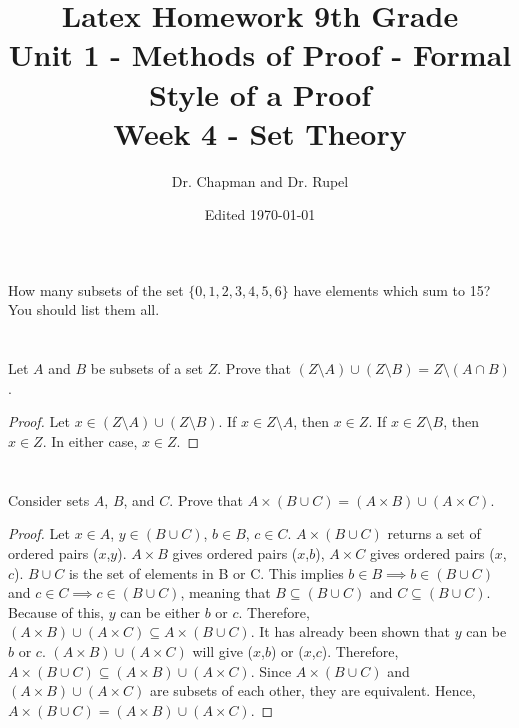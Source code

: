 \usepackage[utf8]{inputenc}
\usepackage{amsmath, amsfonts,fullpage,tikz}
\usepackage{amsthm}

\title{Latex Homework 9th Grade\\ Unit 1 - Methods of Proof - Formal Style of a Proof\\ Week 4 - Set Theory}
\author{Dr. Chapman and Dr. Rupel}
\date{Edited \today}
\newcommand{\sm}{\setminus}


\maketitle

\section{}
    How many subsets of the set \(\{0,1,2,3,4,5,6\}\) have elements which sum to 15?
    You should list them all.

\section{}
    Let $A$ and $B$ be subsets of a set $Z$.
    Prove that $(Z\sm A)\cup(Z\sm B)=Z\sm(A\cap B)$.
    \begin{proof}
     Let $x \in (Z\sm A)\cup(Z\sm B)$. If $x\in Z\sm A$, then $x\in Z$. If $x\in Z\sm B$, then $x\in Z$. In either case, $x\in Z$.
    \end{proof}
\section{}
    Consider sets $A$, $B$, and $C$.
    Prove that $A\times(B\cup C)=(A\times B)\cup(A\times C)$.
	\begin{proof}
	Let $x\in A$, $y\in(B\cup C)$, $b\in B$, $c\in C$. $A\times(B\cup C)$ returns a set of ordered pairs ($x$,$y$). $A\times B$ gives ordered pairs ($x$,$b$), $A\times C$ gives ordered pairs ($x$, $c$). $B\cup C$ is the set of elements in B or C. This implies $b\in B \implies b\in(B\cup C)$ and $c\in C\implies c\in(B\cup C)$, meaning that $B\subseteq (B\cup C)$ and $C\subseteq (B\cup C)$. Because of this, $y$ can be either $b$ or $c$. Therefore, $(A\times B)\cup(A\times C)\subseteq A\times(B\cup C)$. It has already been shown that $y$ can be $b$ or $c$. $(A\times B)\cup(A\times C)$ will give ($x$,$b$) or ($x$,$c$). Therefore, $A\times(B\cup C)\subseteq(A\times B)\cup(A\times C)$. Since $A\times(B\cup C)$ and $(A\times B)\cup(A\times C)$ are subsets of each other, they are equivalent. Hence, $A\times(B\cup C)=(A\times B)\cup(A\times C)$. 
	\end{proof}

